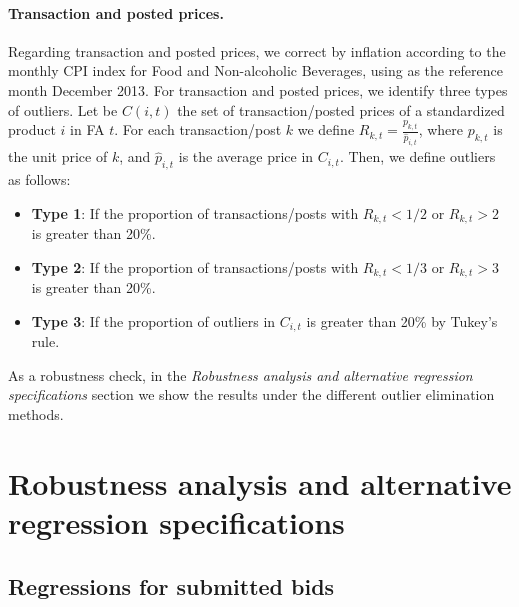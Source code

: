 \paragraph{Transaction and posted prices.} Regarding transaction and posted prices, we correct by inflation according to the monthly CPI index for Food and Non-alcoholic Beverages, using as the reference month December 2013. For transaction and posted prices, we identify three types of outliers. Let be $C(i,t)$ the set of transaction/posted prices of a standardized product $i$ in FA $t$. For each transaction/post $k$ we define $R_{k,t} = \frac{p_{k,t}}{\hat{p}_{i,t}}$, where $p_{k,t}$ is the unit price of $k$, and $\hat{p}_{i,t}$ is the average price in $C_{i,t}$. Then, we define outliers as follows:

\begin{itemize}
\item[] \textbf{Type 1}: If the proportion of transactions/posts with $R_{k,t}<1/2$ or $R_{k,t}>2$ is greater than 20\%.
\item[] \textbf{Type 2}: If the proportion of transactions/posts with $R_{k,t}<1/3$ or $R_{k,t}>3$ is greater than 20\%.
\item[] \textbf{Type 3}: If the proportion of outliers in $C_{i,t}$ is greater than 20\% by Tukey's rule.
\end{itemize}

As a robustness check, in the \textit{Robustness analysis and alternative regression specifications} section we show the results under the different outlier elimination methods.


\section{Robustness analysis and alternative regression 
 specifications}\label{app:robustness}


\subsection{Regressions for submitted bids}







